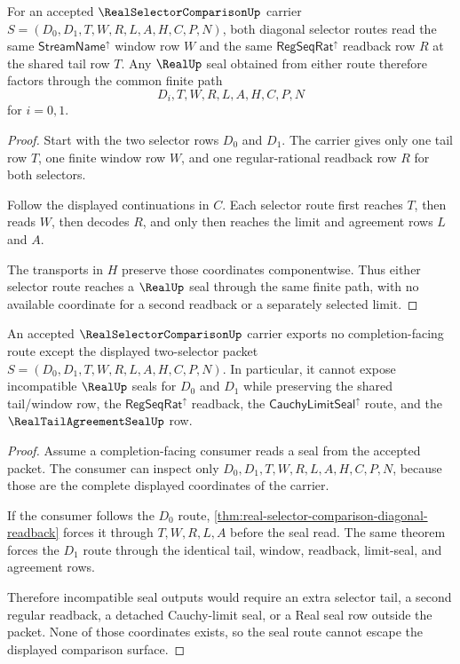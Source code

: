 \begin{theorem}
\label{thm:real-selector-comparison-diagonal-readback}
For an accepted $\RealSelectorComparisonUp$ carrier $S=(D_0,D_1,T,W,R,L,A,H,C,P,N)$, both diagonal selector routes read the same $\mathsf{StreamName}^{\uparrow}$ window row $W$ and the same $\mathsf{RegSeqRat}^{\uparrow}$ readback row $R$ at the shared tail row $T$. Any $\RealUp$ seal obtained from either route therefore factors through the common finite path
$$
D_i,T,W,R,L,A,H,C,P,N
$$
for $i=0,1$.
\end{theorem}
\begin{proof}
Start with the two selector rows $D_0$ and $D_1$. The carrier gives only one tail row $T$, one finite window row $W$, and one regular-rational readback row $R$ for both selectors.

Follow the displayed continuations in $C$. Each selector route first reaches $T$, then reads $W$, then decodes $R$, and only then reaches the limit and agreement rows $L$ and $A$.

The transports in $H$ preserve those coordinates componentwise. Thus either selector route reaches a $\RealUp$ seal through the same finite path, with no available coordinate for a second readback or a separately selected limit.
\end{proof}

\begin{theorem}
\label{thm:real-selector-comparison-seal-nonescape}
An accepted $\RealSelectorComparisonUp$ carrier exports no completion-facing route except the displayed two-selector packet $S=(D_0,D_1,T,W,R,L,A,H,C,P,N)$. In particular, it cannot expose incompatible $\RealUp$ seals for $D_0$ and $D_1$ while preserving the shared tail/window row, the $\mathsf{RegSeqRat}^{\uparrow}$ readback, the $\mathsf{CauchyLimitSeal}^{\uparrow}$ route, and the $\RealTailAgreementSealUp$ row.
\end{theorem}
\begin{proof}
Assume a completion-facing consumer reads a seal from the accepted packet. The consumer can inspect only $D_0,D_1,T,W,R,L,A,H,C,P,N$, because those are the complete displayed coordinates of the carrier.

If the consumer follows the $D_0$ route, \autoref{thm:real-selector-comparison-diagonal-readback} forces it through $T,W,R,L,A$ before the seal read. The same theorem forces the $D_1$ route through the identical tail, window, readback, limit-seal, and agreement rows.

Therefore incompatible seal outputs would require an extra selector tail, a second regular readback, a detached Cauchy-limit seal, or a Real seal row outside the packet. None of those coordinates exists, so the seal route cannot escape the displayed comparison surface.
\end{proof}

